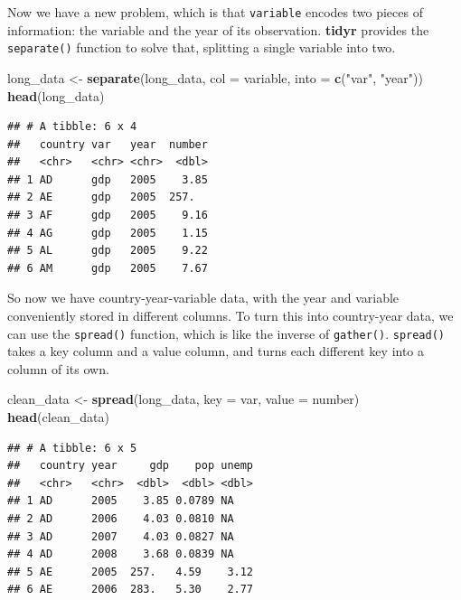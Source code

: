 \documentclass[
  12pt,
  oneside,openany]{book}
\newenvironment{Shaded}{\begin{snugshade}}{\end{snugshade}}
\newcommand{\DataTypeTok}[1]{\textcolor[rgb]{0.13,0.29,0.53}{#1}}
\newcommand{\KeywordTok}[1]{\textcolor[rgb]{0.13,0.29,0.53}{\textbf{#1}}}
\newcommand{\NormalTok}[1]{#1}
\newcommand{\StringTok}[1]{\textcolor[rgb]{0.31,0.60,0.02}{#1}}
\begin{document}
Now we have a new problem, which is that \texttt{variable} encodes two pieces of information: the variable and the year of its observation. \textbf{tidyr} provides the \texttt{separate()} function to solve that, splitting a single variable into two.

\begin{Shaded}
\begin{Highlighting}[]
\NormalTok{long\_data <{-}}\StringTok{ }\KeywordTok{separate}\NormalTok{(long\_data,}
                      \DataTypeTok{col =}\NormalTok{ variable,}
                      \DataTypeTok{into =} \KeywordTok{c}\NormalTok{(}\StringTok{"var"}\NormalTok{, }\StringTok{"year"}\NormalTok{))}
\KeywordTok{head}\NormalTok{(long\_data)}
\end{Highlighting}
\end{Shaded}

\begin{verbatim}
## # A tibble: 6 x 4
##   country var   year  number
##   <chr>   <chr> <chr>  <dbl>
## 1 AD      gdp   2005    3.85
## 2 AE      gdp   2005  257.  
## 3 AF      gdp   2005    9.16
## 4 AG      gdp   2005    1.15
## 5 AL      gdp   2005    9.22
## 6 AM      gdp   2005    7.67
\end{verbatim}

So now we have country-year-variable data, with the year and variable conveniently stored in different columns. To turn this into country-year data, we can use the \texttt{spread()} function, which is like the inverse of \texttt{gather()}. \texttt{spread()} takes a key column and a value column, and turns each different key into a column of its own.

\begin{Shaded}
\begin{Highlighting}[]
\NormalTok{clean\_data <{-}}\StringTok{ }\KeywordTok{spread}\NormalTok{(long\_data,}
                    \DataTypeTok{key =}\NormalTok{ var,}
                    \DataTypeTok{value =}\NormalTok{ number)}
\KeywordTok{head}\NormalTok{(clean\_data)}
\end{Highlighting}
\end{Shaded}

\begin{verbatim}
## # A tibble: 6 x 5
##   country year     gdp    pop unemp
##   <chr>   <chr>  <dbl>  <dbl> <dbl>
## 1 AD      2005    3.85 0.0789 NA   
## 2 AD      2006    4.03 0.0810 NA   
## 3 AD      2007    4.03 0.0827 NA   
## 4 AD      2008    3.68 0.0839 NA   
## 5 AE      2005  257.   4.59    3.12
## 6 AE      2006  283.   5.30    2.77
\end{verbatim}
\end{document}
